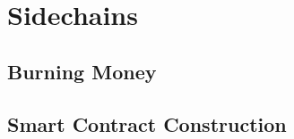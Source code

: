 \chapter{Sidechains}\label{chapter:sidechains}










\section{Burning Money}
\section{Smart Contract Construction}
